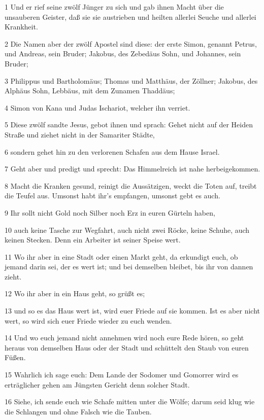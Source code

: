 \par 1 Und er rief seine zwölf Jünger zu sich und gab ihnen Macht über die unsauberen Geister, daß sie sie austrieben und heilten allerlei Seuche und allerlei Krankheit.
\par 2 Die Namen aber der zwölf Apostel sind diese: der erste Simon, genannt Petrus, und Andreas, sein Bruder; Jakobus, des Zebedäus Sohn, und Johannes, sein Bruder;
\par 3 Philippus und Bartholomäus; Thomas und Matthäus, der Zöllner; Jakobus, des Alphäus Sohn, Lebbäus, mit dem Zunamen Thaddäus;
\par 4 Simon von Kana und Judas Ischariot, welcher ihn verriet.
\par 5 Diese zwölf sandte Jesus, gebot ihnen und sprach: Gehet nicht auf der Heiden Straße und ziehet nicht in der Samariter Städte,
\par 6 sondern gehet hin zu den verlorenen Schafen aus dem Hause Israel.
\par 7 Geht aber und predigt und sprecht: Das Himmelreich ist nahe herbeigekommen.
\par 8 Macht die Kranken gesund, reinigt die Aussätzigen, weckt die Toten auf, treibt die Teufel aus. Umsonst habt ihr's empfangen, umsonst gebt es auch.
\par 9 Ihr sollt nicht Gold noch Silber noch Erz in euren Gürteln haben,
\par 10 auch keine Tasche zur Wegfahrt, auch nicht zwei Röcke, keine Schuhe, auch keinen Stecken. Denn ein Arbeiter ist seiner Speise wert.
\par 11 Wo ihr aber in eine Stadt oder einen Markt geht, da erkundigt euch, ob jemand darin sei, der es wert ist; und bei demselben bleibet, bis ihr von dannen zieht.
\par 12 Wo ihr aber in ein Haus geht, so grüßt es;
\par 13 und so es das Haus wert ist, wird euer Friede auf sie kommen. Ist es aber nicht wert, so wird sich euer Friede wieder zu euch wenden.
\par 14 Und wo euch jemand nicht annehmen wird noch eure Rede hören, so geht heraus von demselben Haus oder der Stadt und schüttelt den Staub von euren Füßen.
\par 15 Wahrlich ich sage euch: Dem Lande der Sodomer und Gomorrer wird es erträglicher gehen am Jüngsten Gericht denn solcher Stadt.
\par 16 Siehe, ich sende euch wie Schafe mitten unter die Wölfe; darum seid klug wie die Schlangen und ohne Falsch wie die Tauben.

